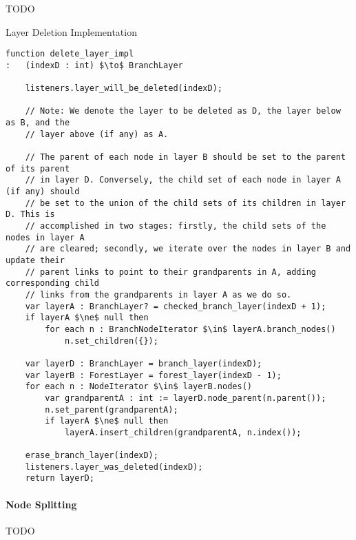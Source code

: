 TODO

\begin{stulisting}[p]
\caption{Layer Deletion Implementation}
\label{code:ipfs-forest-deletelayerimpl}
\begin{lstlisting}[style=Default]
function delete_layer_impl
:	(indexD : int) $\to$ BranchLayer

	listeners.layer_will_be_deleted(indexD);

	// Note: We denote the layer to be deleted as D, the layer below as B, and the
	// layer above (if any) as A.

	// The parent of each node in layer B should be set to the parent of its parent
	// in layer D. Conversely, the child set of each node in layer A (if any) should
	// be set to the union of the child sets of its children in layer D. This is
	// accomplished in two stages: firstly, the child sets of the nodes in layer A
	// are cleared; secondly, we iterate over the nodes in layer B and update their
	// parent links to point to their grandparents in A, adding corresponding child
	// links from the grandparents in layer A as we do so.
	var layerA : BranchLayer? = checked_branch_layer(indexD + 1);
	if layerA $\ne$ null then
		for each n : BranchNodeIterator $\in$ layerA.branch_nodes()
			n.set_children({});

	var layerD : BranchLayer = branch_layer(indexD);
	var layerB : ForestLayer = forest_layer(indexD - 1);
	for each n : NodeIterator $\in$ layerB.nodes()
		var grandparentA : int := layerD.node_parent(n.parent());
		n.set_parent(grandparentA);
		if layerA $\ne$ null then
			layerA.insert_children(grandparentA, n.index());

	erase_branch_layer(indexD);
	listeners.layer_was_deleted(indexD);
	return layerD;

\end{lstlisting}
\end{stulisting}

\paragraph{Node Splitting}

TODO


